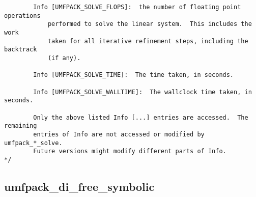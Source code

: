 \documentclass[11pt]{article}
\begin{document}
{\begin{verbatim}
        Info [UMFPACK_SOLVE_FLOPS]:  the number of floating point operations
            performed to solve the linear system.  This includes the work
            taken for all iterative refinement steps, including the backtrack
            (if any).

        Info [UMFPACK_SOLVE_TIME]:  The time taken, in seconds.

        Info [UMFPACK_SOLVE_WALLTIME]:  The wallclock time taken, in seconds.

        Only the above listed Info [...] entries are accessed.  The remaining
        entries of Info are not accessed or modified by umfpack_*_solve.
        Future versions might modify different parts of Info.
*/
\end{verbatim}
}

\newpage

\subsection{umfpack\_di\_free\_symbolic}
\end{document}
